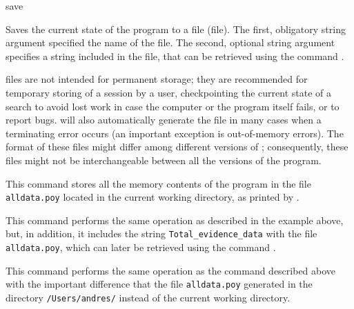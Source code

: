 
\begin{command}{save}{}

\syntax{\obligatory{(\poystring\optional{,\poystring})}}

\begin{poydescription}
Saves the current \poy state of the program to a file (\poy file). The
first, obligatory string argument specified the name of the \poy file.
The second, optional string argument specifies a string included in the
\poy file, that can be retrieved using the command .

\poy files are not intended for permanent storage; they are recommended
for temporary storing of a \poy session by a user, checkpointing the
current state of a search to avoid lost work in case the computer or the
program itself fails, or to report bugs. \poy will also automatically
generate the file in many cases when a terminating error occurs (an
important exception is out-of-memory errors). The format of these files
might differ among different versions of \poy; consequently, these files
might not be interchangeable between all the versions of the program.
\end{poydescription}

\begin{poyexamples}
{This command stores all the memory contents of the program in the
file \texttt{alldata.poy} located in the current working directory,
as printed by .}

{This command performs the same operation as described in the example above,
but, in addition, it includes the string \texttt{Total\_evidence\_data} 
with the file \texttt{alldata.poy},
which can later be retrieved using the command .}

{This command performs the same operation as the command described above
with the important difference that the file \texttt{alldata.poy} generated in the
directory \texttt{/Users/andres/} instead of the current working directory.}
\end{poyexamples}

\begin{poyalso}
\end{poyalso}

\end{command}

